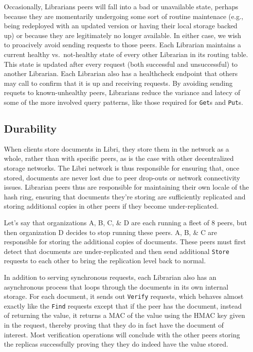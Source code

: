\documentclass[10pt]{article}
\newcommand{\ttt}[1]{\texttt{#1}}
\begin{document}
Occasionally, Librarians peers will fall into a bad or unavailable state, perhaps because they are momentarily undergoing some sort of routine maintenace (e.g., being redeployed with an updated version or having their local storage backed up) or because they are legitimately no longer available. In either case, we wish to proacively avoid sending requests to those peers. Each Librarian maintains a current healthy vs.\ not-healthy state of every other Librarian in its routing table. This state is updated after every request (both successful and unsuccessful) to another Librarian. Each Librarian also has a healthcheck endpoint that others may call to confirm that it is up and receiving requests. By avoiding sending requets to known-unhealthy peers, Librarians reduce the variance and latecy of some of the more involved query patterns, like those required for \ttt{Get}s and \texttt{Put}s.

\subsection{Durability}
When clients store documents in Libri, they store them in the network as a whole, rather than with specific peers, as is the case with other decentralized storage networks\cite{bittorrent-review,ipfs}. The Libri network is thus responsible for ensuring that, once stored, documents are never lost due to peer drop-outs or network connectivity issues. Librarian peers thus are responsible for maintaining their own locale of the hash ring, ensuring that documents they're storing are sufficiently replicated and storing additional copies in other peers if they become under-replicated. 

Let's say that organizations A, B, C, \& D are each running a fleet of 8 peers, but then organization D decides to stop running these peers. A, B, \& C are responsible for storing the additional copies of documents. These peers must first detect that documents are under-replicated and then send additional \ttt{Store} requests to each other to bring the replication level back to normal. 

In addition to serving synchronous requests, each Librarian also has an asynchronous process that loops through the documents in its own internal storage. For each document, it sends out \ttt{Verify} requests, which behaves almost exactly like the \texttt{Find} requests except that if the peer has the document, instead of returning the value, it returns a MAC of the value using the HMAC key given in the request, thereby proving that they do in fact have the document of interest. Most verification operations will conclude with the other peers storing the replicas successfully proving they they do indeed have the value stored. 
\end{document}
